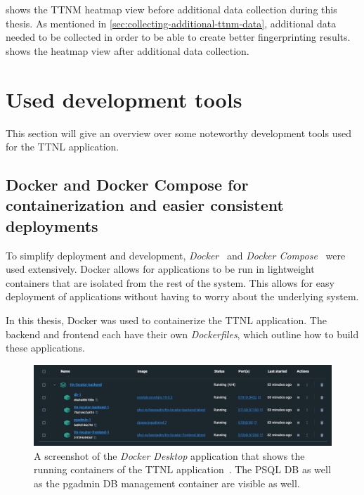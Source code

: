  shows the \ac{TTNM} heatmap view before additional data collection during this thesis.
As mentioned in \cref{sec:collecting-additional-ttnm-data}, additional data needed to be collected in order to be able to create better fingerprinting results.
 shows the heatmap view after additional data collection.

\section{Used development tools}

This section will give an overview over some noteworthy development tools used for the \ac{TTNL} application.

\subsection{Docker and Docker Compose for containerization and easier consistent deployments}

To simplify deployment and development, \emph{Docker}~\cite{docker_inc_docker_2022} and \emph{Docker Compose}~\cite{docker_inc_docker_2023} were used extensively.
Docker allows for applications to be run in lightweight containers that are isolated from the rest of the system.
This allows for easy deployment of applications without having to worry about the underlying system.

In this thesis, Docker was used to containerize the \ac{TTNL} application.
The backend and frontend each have their own \emph{Dockerfiles}, which outline how to build these applications.

\begin{figure}[htbp]
    \centering
    \includegraphics[width=1\textwidth]{pictures/ttn-locator/docker_desktop.png}
    \caption{
        A screenshot of the \emph{Docker Desktop} application that shows the running containers of the \ac{TTNL} application~\cite{docker_inc_download_2021}.
        The \acl{PSQL} \ac{DB} as well as the pgadmin \ac{DB} management container are visible as well.
    }\label{pic:docker-desktop}
\end{figure}

